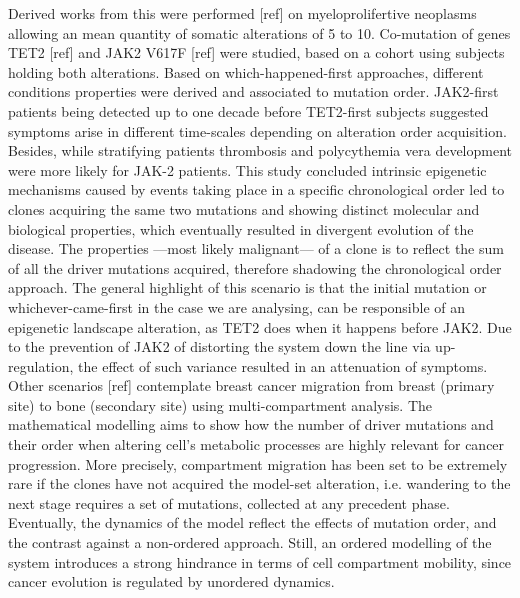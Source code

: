 Derived works from this were performed [ref] on myeloprolifertive neoplasms allowing an mean quantity of somatic alterations of 5 to 10. Co-mutation of genes TET2 [ref] and JAK2 V617F [ref] were studied, based on a cohort using subjects holding both alterations. Based on which-happened-first approaches, different conditions properties were derived and associated to mutation order. JAK2-first patients being detected up to one decade  before TET2-first subjects suggested symptoms arise in different time-scales depending on alteration order acquisition. Besides, while stratifying patients thrombosis and polycythemia vera development were more likely for JAK-2 patients. This study concluded intrinsic epigenetic mechanisms caused by events taking place in a specific chronological order led to clones acquiring the same two mutations and showing distinct molecular and biological properties, which eventually resulted in divergent evolution of the disease. The properties —most likely malignant— of a clone is to reflect the sum of all the driver mutations acquired, therefore shadowing the chronological order approach. The general highlight of this scenario is that the initial mutation or whichever-came-first in the case we are analysing, can be responsible of an epigenetic landscape alteration, as TET2 does when it happens before JAK2. Due to the prevention of JAK2 of distorting the system down the line via up-regulation, the effect of such variance resulted in an attenuation of symptoms.
\\

Other scenarios [ref] contemplate breast cancer migration from breast (primary site) to bone (secondary site) using multi-compartment analysis. The mathematical modelling aims to show how the number of driver mutations and their order when altering cell’s metabolic processes are highly relevant for cancer progression. More precisely, compartment migration has been set to be extremely rare if the clones have not acquired the model-set alteration, i.e. wandering to the next stage requires a set of mutations, collected at any precedent phase. Eventually, the dynamics of the model reflect the effects of mutation order, and the contrast against a non-ordered approach. Still, an ordered modelling of the system introduces a strong hindrance in terms of cell compartment mobility, since cancer evolution is regulated by unordered dynamics.
\\

